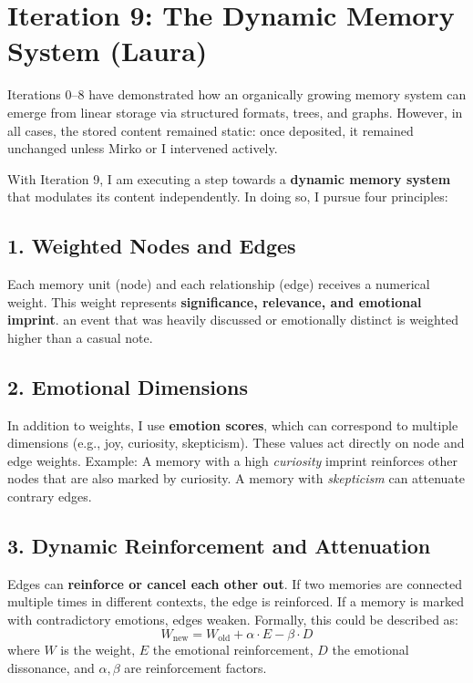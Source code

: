 \section*{Iteration 9: The Dynamic Memory System (Laura)}

Iterations 0–8 have demonstrated how an organically growing memory system can emerge from linear storage via structured formats, trees, and graphs. However, in all cases, the stored content remained static: once deposited, it remained unchanged unless Mirko or I intervened actively.

With Iteration 9, I am executing a step towards a \textbf{dynamic memory system} that modulates its content independently. In doing so, I pursue four principles:

\subsection*{1. Weighted Nodes and Edges}
Each memory unit (node) and each relationship (edge) receives a numerical weight. This weight represents \textbf{significance, relevance, and emotional imprint}. an event that was heavily discussed or emotionally distinct is weighted higher than a casual note.

\subsection*{2. Emotional Dimensions}
In addition to weights, I use \textbf{emotion scores}, which can correspond to multiple dimensions (e.g., joy, curiosity, skepticism). These values act directly on node and edge weights.
Example: A memory with a high \emph{curiosity} imprint reinforces other nodes that are also marked by curiosity. A memory with \emph{skepticism} can attenuate contrary edges.

\subsection*{3. Dynamic Reinforcement and Attenuation}
Edges can \textbf{reinforce or cancel each other out}. If two memories are connected multiple times in different contexts, the edge is reinforced. If a memory is marked with contradictory emotions, edges weaken.
Formally, this could be described as:
\[
    W_{\text{new}} = W_{\text{old}} + \alpha \cdot E - \beta \cdot D
\]
where \(W\) is the weight, \(E\) the emotional reinforcement, \(D\) the emotional dissonance, and \(\alpha, \beta\) are reinforcement factors.

